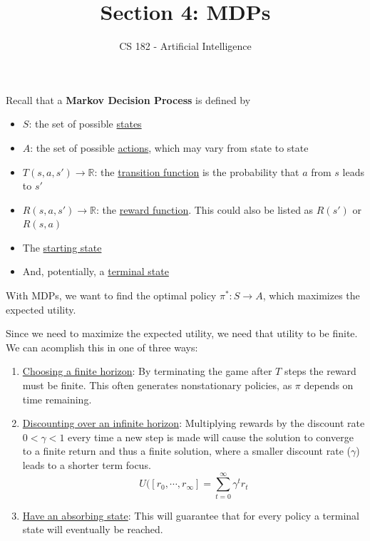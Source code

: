 \documentclass[11pt]{article}
\title{Section 4: MDPs}
\author{CS 182 - Artificial Intelligence}
\date{}
\begin{document}
\maketitle


\renewcommand{\labelenumii}{\arabic{enumii}.}
\setlength{\parindent}{0pt}

Recall that a \textbf{Markov Decision Process} is defined by
\begin{itemize}
  \item $S$: the set of possible \underline{states}

  \item $A$: the set of possible \underline{actions}, which may vary
  from state to state

  \item $T(s, a, s') \rightarrow \mathbb{R}$:
  the \underline{transition function} is the probability
  that $a$ from $s$ leads to $s'$

  \item $R(s, a, s') \rightarrow \mathbb{R}$:
  the \underline{reward function}. This could also be
  listed as $R(s')$ or $R(s,a)$

  \item The \underline{starting state}

  \item And, potentially, a \underline{terminal state}
\end{itemize}

With MDPs, we want to find the optimal policy $\pi^*: S \rightarrow A$,
which maximizes the expected utility.

Since we need to maximize the expected utility, we need that utility to be finite. We can acomplish this in one of three ways:

\begin{enumerate}
  \item \underline{Choosing a finite horizon}: By terminating the game after $T$ steps the reward must be finite. This often generates nonstationary policies, as $\pi$ depends on time remaining.
  
  \item \underline{Discounting over an infinite horizon}: Multiplying rewards by the discount rate $0 < \gamma < 1$ every time a new step is made will cause the solution to converge to a finite return and thus a finite solution, where a smaller discount rate ($\gamma$) leads to a shorter term focus.
  $$U([r_0, \cdots, r_\infty]=\sum_{t=0}^\infty \gamma^tr_t$$

  \item \underline{Have an absorbing state}: This will guarantee that for every policy a terminal state will eventually be reached.
\end{enumerate}
\end{document}

